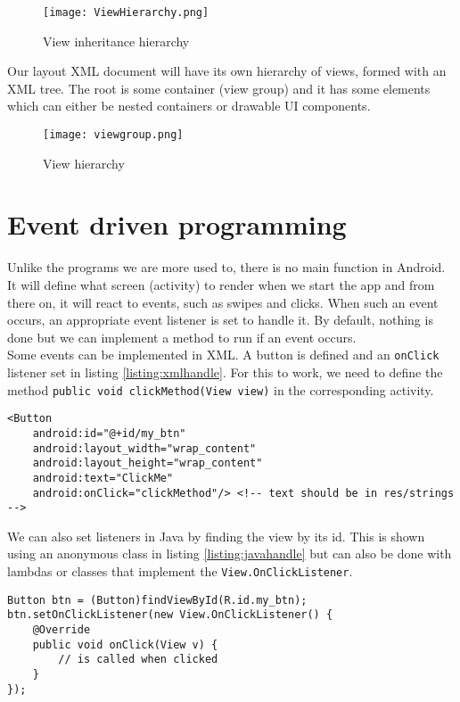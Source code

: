\begin{figure}[H]
\centering
\texttt{[image: ViewHierarchy.png]}
\caption{View inheritance hierarchy}
\label{fig:inherhia}
\end{figure}

Our layout XML document will have its own hierarchy of views, formed with an XML tree. The root is some container (view group) and it has some elements which can either be nested containers or drawable UI components. 

\begin{figure}[H]
  \centering
  \texttt{[image: viewgroup.png]}
  \caption{View hierarchy}
  \label{fig:viewhia}
\end{figure}

\section{Event driven programming}
Unlike the programs we are more used to, there is no main function in Android. It will define what screen (activity) to render when we start the app and from there on, it will react to events, such as swipes and clicks. When such an event occurs, an appropriate event listener is set to handle it. By default, nothing is done but we can implement a method to run if an event occurs.\\

Some events can be implemented in XML. A button is defined and an \texttt{onClick} listener set in listing \ref{listing:xmlhandle}. For this to work, we need to define the method \texttt{public void clickMethod(View view)} in the corresponding activity. 
\begin{lstlisting}[style=A_XML, caption={Handling events in XML}, label = {listing:xmlhandle}]
<Button
    android:id="@+id/my_btn"
    android:layout_width="wrap_content"
    android:layout_height="wrap_content"
    android:text="ClickMe" 
    android:onClick="clickMethod"/> <!-- text should be in res/strings -->
\end{lstlisting}
We can also set listeners in Java by finding the view by its id. This is shown using an anonymous class in listing \ref{listing:javahandle} but can also be done with lambdas or classes that implement the \texttt{View.OnClickListener}.
\begin{lstlisting}[style=A_Java, caption={Handling events in Java}, label = {listing:javahandle}]
Button btn = (Button)findViewById(R.id.my_btn);
btn.setOnClickListener(new View.OnClickListener() {
    @Override
    public void onClick(View v) {
        // is called when clicked
    }
});
\end{lstlisting}


